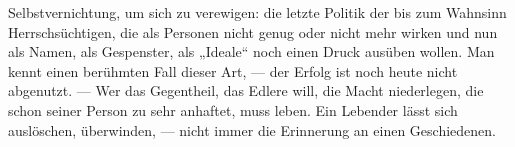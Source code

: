Selbstvernichtung, um sich zu verewigen: die letzte Politik der bis zum Wahnsinn Herrschsüchtigen, die als Personen nicht genug oder nicht mehr wirken und nun als Namen, als Gespenster, als „Ideale“ noch einen Druck ausüben wollen. Man kennt einen berühmten Fall dieser Art, — der Erfolg ist noch heute nicht abgenutzt. — Wer das Gegentheil, das Edlere will, die Macht niederlegen, die schon seiner Person zu sehr anhaftet, muss leben. Ein Lebender lässt sich auslöschen, überwinden, — nicht immer die Erinnerung an einen Geschiedenen.
\par

